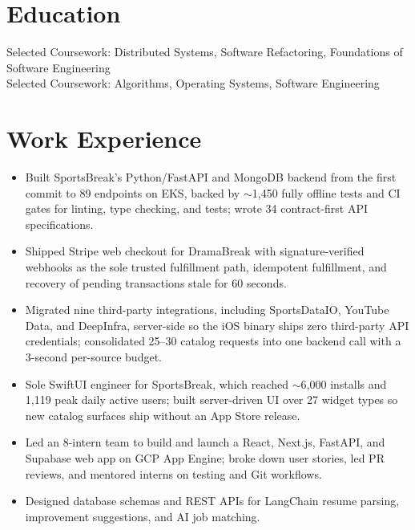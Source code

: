 \documentclass[11pt, letterpaper]{article}
\begin{document}

\section{Education}
Selected Coursework: Distributed Systems, Software Refactoring, Foundations of Software Engineering\\[1pt]
Selected Coursework: Algorithms, Operating Systems, Software Engineering

\section{Work Experience}
\begin{itemize}
  \item Built SportsBreak's Python/FastAPI and MongoDB backend from the first commit to 89 endpoints on EKS, backed by $\sim$1{,}450 fully offline tests and CI gates for linting, type checking, and tests; wrote 34 contract-first API specifications.
  \item Shipped Stripe web checkout for DramaBreak with signature-verified webhooks as the sole trusted fulfillment path, idempotent fulfillment, and recovery of pending transactions stale for 60 seconds.
  \item Migrated nine third-party integrations, including SportsDataIO, YouTube Data, and DeepInfra, server-side so the iOS binary ships zero third-party API credentials; consolidated 25--30 catalog requests into one backend call with a 3-second per-source budget.
  \item Sole SwiftUI engineer for SportsBreak, which reached $\sim$6{,}000 installs and 1{,}119 peak daily active users; built server-driven UI over 27 widget types so new catalog surfaces ship without an App Store release.
\end{itemize}

\begin{itemize}
  \item Led an 8-intern team to build and launch a React, Next.js, FastAPI, and Supabase web app on GCP App Engine; broke down user stories, led PR reviews, and mentored interns on testing and Git workflows.
  \item Designed database schemas and REST APIs for LangChain resume parsing, improvement suggestions, and AI job matching.
\end{itemize}
\end{document}
